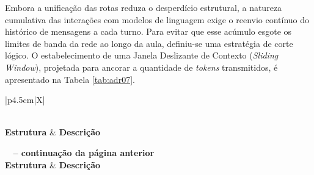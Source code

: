 Embora a unificação das rotas reduza o desperdício estrutural, a natureza cumulativa das interações com modelos de linguagem exige o reenvio contínuo do histórico de mensagens a cada turno. Para evitar que esse acúmulo esgote os limites de banda da rede ao longo da aula, definiu-se uma estratégia de corte lógico. O estabelecimento de uma Janela Deslizante de Contexto (\textit{Sliding Window}), projetada para ancorar a quantidade de \textit{tokens} transmitidos, é apresentado na Tabela \ref{tab:adr07}.

{
\footnotesize 
\renewcommand{\arraystretch}{1.1}

\begin{xltabular}{\textwidth}{|p{4.5cm}|X|}
    \caption{Registro de Decisão Arquitetural (ADR 07): Controle e Dimensionamento de Contexto}
    \label{tab:adr07} \\
    \toprule
    \textbf{Estrutura} & \textbf{Descrição} \\
    \midrule
    \endfirsthead

    {{\bfseries \tablename\ \thetable{} -- continuação da página anterior}} \\
    \toprule
    \textbf{Estrutura} & \textbf{Descrição} \\
    \midrule
    \endhead

    \midrule {} \\
    \endfoot

    \bottomrule
     \\
    \endlastfoot
    

\end{xltabular}}
